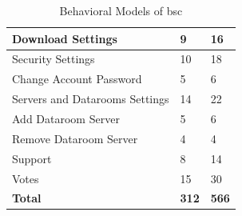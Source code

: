 \begin{table}[]
\begin{tabular}{|l|l|l|}
        \hline
        Download Settings & 9 & 16 \\
        \hline
        Security Settings & 10 & 18 \\
        \hline
        Change Account Password & 5 & 6 \\
        \hline
        Servers and Datarooms Settings & 14 & 22 \\
        \hline
        Add Dataroom Server & 5 & 6 \\
        \hline
        Remove Dataroom Server & 4 & 4 \\
        \hline
        Support & 8 & 14 \\
        \hline
        Votes & 15 & 30 \\
        \hline
        \textbf{Total} & \textbf{312} & \textbf{566} \\
        \hline
    \end{tabular}
    \caption{Behavioral Models of \acrshort{bsc}}
    \label{tab:Behavioral_models}
\end{table}














